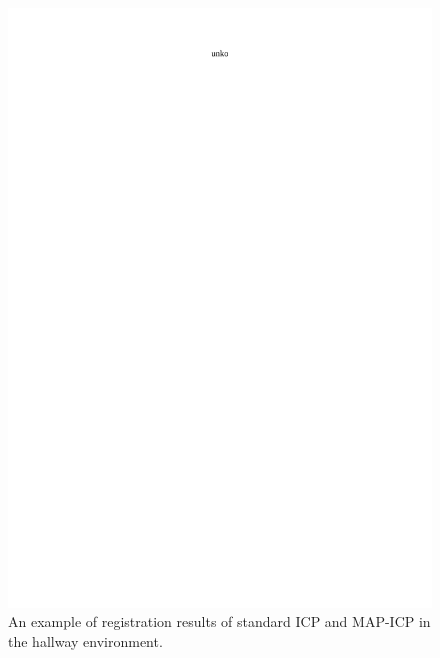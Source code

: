 \documentclass[uplatex, twocolumn, 9pt]{jsproceedings}
\begin{document}
\begin{figure}
  \centering
  \includegraphics[width=130mm]{fig/icp-comp_viz_hall_normal.pdf}
  \caption{An example of registration results of standard ICP and MAP-ICP in the hallway environment.}
  \label{fig:icp-comp_viz_hall_normal}%
\end{figure}
\end{document}

